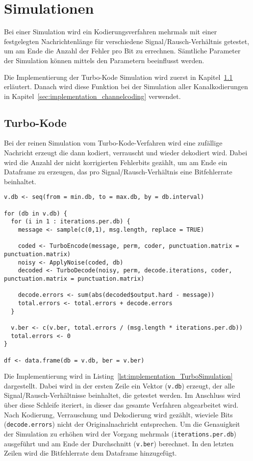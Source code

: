 \FloatBarrier
\section{Simulationen}
\label{sec:implementation_simulation}
Bei einer Simulation wird ein Kodierungsverfahren mehrmals mit einer festgelegten Nachrichtenlänge für verschiedene Signal/Rausch-Verhältnis getestet, um am Ende die Anzahl der Fehler pro Bit zu errechnen. Sämtliche Parameter der Simulation können mittels den Parametern beeinflusst werden.

Die Implementierung der Turbo-Kode Simulation wird zuerst in Kapitel~\ref{sec:implementation_turbo} erläutert. Danach wird diese Funktion bei der Simulation aller Kanalkodierungen in Kapitel~\ref{sec:implementation_channelcoding} verwendet.

\subsection{Turbo-Kode}
\label{sec:implementation_turbo}
Bei der reinen Simulation vom Turbo-Kode-Verfahren wird eine zufällige Nachricht erzeugt die dann kodiert, verrauscht und wieder dekodiert wird. Dabei wird die Anzahl der nicht korrigierten Fehlerbits gezählt, um am Ende ein Dataframe zu erzeugen, das pro Signal/Rausch-Verhältnis eine Bitfehlerrate beinhaltet.

\begin{lstlisting}[caption=Implementierung von \texttt{TurboSimulation}, label={lst:implementation_TurboSimulation}, float=!th]
v.db <- seq(from = min.db, to = max.db, by = db.interval)

for (db in v.db) {
  for (i in 1 : iterations.per.db) {
    message <- sample(c(0,1), msg.length, replace = TRUE)
    
    coded <- TurboEncode(message, perm, coder, punctuation.matrix = punctuation.matrix)
    noisy <- ApplyNoise(coded, db)
    decoded <- TurboDecode(noisy, perm, decode.iterations, coder, punctuation.matrix = punctuation.matrix)
                             
    decode.errors <- sum(abs(decoded$output.hard - message))
    total.errors <- total.errors + decode.errors
  }

  v.ber <- c(v.ber, total.errors / (msg.length * iterations.per.db))
  total.errors <- 0
}

df <- data.frame(db = v.db, ber = v.ber)
\end{lstlisting}

Die Implementierung wird in Listing~\ref{lst:implementation_TurboSimulation} dargestellt. Dabei wird in der ersten Zeile ein Vektor (\texttt{v.db}) erzeugt, der alle Signal/Rausch-Verhältnisse beinhaltet, die getestet werden. Im Anschluss wird über diese Schleife iteriert, in dieser das gesamte Verfahren abgearbeitet wird. Nach Kodierung, Verrauschung und Dekodierung wird gezählt, wieviele Bits (\texttt{decode.errors}) nicht der Originalnachricht entsprechen. Um die Genauigkeit der Simulation zu erhöhen wird der Vorgang mehrmals (\texttt{iterations.per.db}) ausgeführt und am Ende der Durchschnitt (\texttt{v.ber}) berechnet. In den letzten Zeilen wird die Bitfehlerrate dem Dataframe hinzugefügt.

